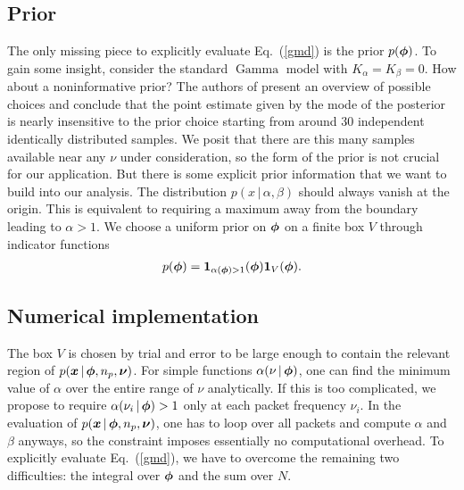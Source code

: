 \documentclass[11pt]{article}
\newcommand{\cond}{\,|\,}
\newcommand{\refeq}[1]{Eq.~(\ref{#1})}
\DeclareMathOperator{\GammaDist}{Gamma}
\newcommand{\Kalpha}{{K_\alpha}}
\newcommand{\Kbeta}{{K_\beta}}
\newcommand{\npack}{{n_p}}
\begin{document}
\subsection{Prior} \label{sec:priors}

The only missing piece to explicitly evaluate \refeq{gmd} is the prior
$p({\bm{\phi}})$. To gain some insight, consider the standard $\GammaDist$
model with $\Kalpha = \Kbeta = 0$.
How about a noninformative prior? The authors of
\cite{moala2013bayesian} present an overview of possible choices and
conclude that the point estimate given by the mode of the posterior is
nearly insensitive to the prior choice starting from around 30
independent identically distributed samples. We posit that there are
this many samples available near any $\nu$ under consideration, so the
form of the prior is not crucial for our application. But there is
some explicit prior information that we want to build into our
analysis. The distribution $p(x \cond \alpha, \beta)$ should always
vanish at the origin. This is equivalent to requiring a maximum away
from the boundary leading to $\alpha > 1$. We choose a uniform prior
on ${\bm{\phi}}$ on a finite box $V$ through indicator functions
\begin{align}
  p({\bm{\phi}}) = \mathbf{1}_{\alpha({\bm{\phi}}) > 1}({\bm{\phi}}) \mathbf{1}_V({\bm{\phi}}).
\end{align}

\subsection{Numerical implementation} \label{sec:numerical}

The box $V$ is chosen by trial and error to be large enough to contain
the relevant region of $p(\bmx\cond \bmphi, \npack, \bmnu)$. For
simple functions $\alpha(\nu \cond \bmphi)$, one can find the minimum
value of $\alpha$ over the entire range of $\nu$ analytically. If this
is too complicated, we propose to require $\alpha(\nu_i \cond \bmphi)
> 1$ only at each packet frequency $\nu_i$. In the evaluation of
$p(\bmx \cond \bmphi, \npack, \bmnu)$, one has to loop over all
packets and compute $\alpha$ and $\beta$ anyways, so the constraint
imposes essentially no computational overhead.  To explicitly evaluate
\refeq{gmd}, we have to overcome the remaining two difficulties: the
integral over ${\bm{\phi}}$ and the sum over $N$.
\end{document}
